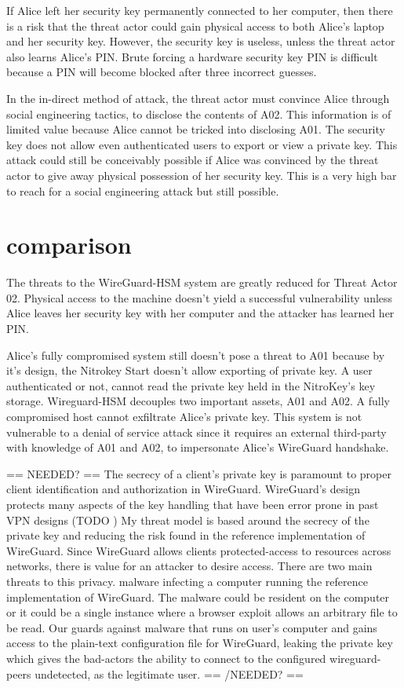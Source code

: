 \documentclass [11pt, proquest] {uwthesis}[2020/02/24]
\begin{document}
If Alice left her security key permanently connected to her computer, then there is a risk that the threat actor could gain physical access to both Alice's laptop and her security key. However, the security key is useless, unless the threat actor also learns Alice's PIN. Brute forcing a hardware security key PIN is difficult because a PIN will become blocked after three incorrect guesses.

In the in-direct method of attack, the threat actor must convince Alice through social engineering tactics, to disclose the contents of A02. This information is of limited value because Alice cannot be tricked into disclosing A01. The security key does not allow even authenticated users to export or view a private key.
This attack could still be conceivably possible if Alice was convinced by the threat actor to give away physical possession of her security key. This is a very high bar to reach for a social engineering attack but still possible.


\section{comparison}
The threats to the WireGuard-HSM system are greatly reduced for Threat Actor 02. Physical access to the machine doesn't yield a successful vulnerability unless Alice leaves her security key with her computer and the attacker has learned her PIN.

Alice's fully compromised system still doesn't pose a threat to A01 because by it's design, the Nitrokey Start doesn't allow exporting of private key. A user authenticated or not, cannot read the private key held in the NitroKey's key storage.
Wireguard-HSM decouples two important assets, A01 and A02. A fully compromised host cannot exfiltrate Alice's private key. This system is not vulnerable to a denial of service attack since it requires an external third-party with knowledge of A01 and A02, to impersonate Alice's WireGuard handshake.



== NEEDED? ==
The secrecy of a client's private key is paramount to proper client identification and authorization in WireGuard. WireGuard's design protects many aspects of the key handling that have been error prone in past VPN designs (TODO )
My threat model is based around the secrecy of the private key and reducing the risk found in the reference implementation of WireGuard. Since WireGuard allows clients protected-access to resources across networks, there is value for an attacker to desire access. 
There are two main threats to this privacy.  malware infecting a computer running the reference implementation of WireGuard. The malware could be resident on the computer or it could be a single instance where a browser exploit allows an arbitrary file to be read. Our guards against malware that runs on user's computer and gains access to the plain-text configuration file for WireGuard, leaking the private key which gives the bad-actors the ability to connect to the configured wireguard-peers undetected, as the legitimate user.
== /NEEDED? ==
\end{document}
